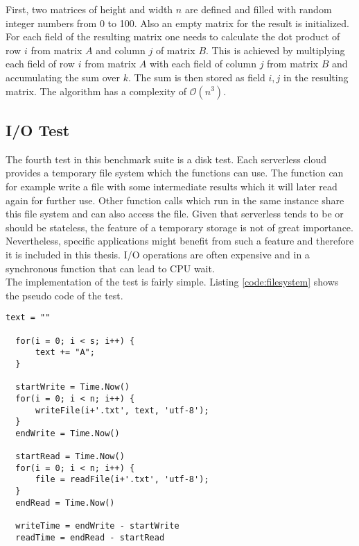 First, two matrices of height and width $n$ are defined and filled with random integer numbers from 0 to 100. Also an empty matrix for the result is initialized. For each field of the resulting matrix one needs to calculate the dot product of row $i$ from matrix $A$ and column $j$ of matrix $B$. This is achieved by multiplying each field of row $i$ from matrix $A$ with each field of column $j$ from matrix $B$ and accumulating the sum over $k$. The sum is then stored as field $i,j$ in the resulting matrix. The algorithm has a complexity of $\mathcal{O}(n^{3})$.
\subsection{I/O Test}
The fourth test in this benchmark suite is a disk test. Each serverless cloud provides a temporary file system which the functions can use. The function can for example write a file with some intermediate results which it will later read again for further use. Other function calls which run in the same instance share this file system and can also access the file. Given that serverless tends to be or should be stateless, the feature of a temporary storage is not of great importance. Nevertheless, specific applications might benefit from such a feature and therefore it is included in this thesis. I/O operations are often expensive and in a synchronous function that can lead to \gls{CPU} wait.\\
The implementation of the test is fairly simple. Listing \ref{code:filesystem} shows the pseudo code of the test.


\begin{minipage}{\linewidth}
\begin{lstlisting}[frame=single,caption={I/O test pseudo code},label=code:filesystem,linewidth=0.75\textwidth,xleftmargin=.25\textwidth]
  text = ""
    
  for(i = 0; i < s; i++) {
      text += "A";
  }
  
  startWrite = Time.Now()
  for(i = 0; i < n; i++) {
      writeFile(i+'.txt', text, 'utf-8');
  }
  endWrite = Time.Now()
  
  startRead = Time.Now()
  for(i = 0; i < n; i++) {
      file = readFile(i+'.txt', 'utf-8');
  }
  endRead = Time.Now()
  
  writeTime = endWrite - startWrite
  readTime = endRead - startRead
\end{lstlisting}
\end{minipage}
\newline

